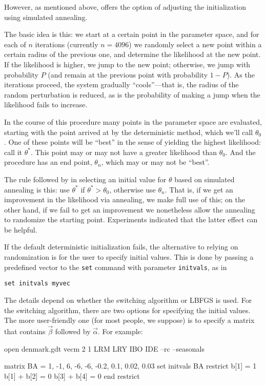 However, as mentioned above,  offers the option of adjusting the
initialization using simulated annealing.  

The basic idea is this: we start at a certain point in the parameter
space, and for each of $n$ iterations (currently $n=4096$) we randomly
select a new point within a certain radius of the
previous one, and determine the likelihood at the new point.  If the
likelihood is higher, we jump to the new point; otherwise, we jump
with probability $P$ (and remain at the previous point with
probability $1-P$).  As the iterations proceed, the system gradually
``cools''---that is, the radius of the random perturbation is
reduced, as is the probability of making a jump when the likelihood
fails to increase.

In the course of this procedure many points in the parameter space are
evaluated, starting with the point arrived at by the deterministic
method, which we'll call $\theta_0$.  One of these points will be
``best'' in the sense of yielding the highest likelihood: call it
$\theta^*$.  This point may or may not have a greater likelihood than
$\theta_0$.  And the procedure has an end point, $\theta_n$, which may
or may not be ``best''.

The rule followed by  in selecting an initial value for $\theta$
based on simulated annealing is this: use $\theta^*$ if $\theta^* >
\theta_0$, otherwise use $\theta_n$.  That is, if we get an
improvement in the likelihood via annealing, we make full use of this;
on the other hand, if we fail to get an improvement we nonetheless
allow the annealing to randomize the starting point.  Experiments
indicated that the latter effect can be helpful.

If the default deterministic initialization fails, the alternative to
relying on randomization is for the user to specify initial values.
This is done by passing a predefined vector to the \texttt{set}
command with parameter \texttt{initvals}, as in
%
\begin{verbatim}
set initvals myvec
\end{verbatim}

The details depend on whether the switching algorithm or LBFGS is
used.  For the switching algorithm, there are two options for
specifying the initial values.  The more user-friendly one (for most
people, we suppose) is to specify a matrix that contains $\vec{\beta}$
followed by $\vec{\alpha}$. For example:
\begin{code}
open denmark.gdt
vecm 2 1 LRM LRY IBO IDE --rc --seasonals

matrix BA = {1, -1, 6, -6, -6, -0.2, 0.1, 0.02, 0.03}
set initvals BA
restrict
  b[1] = 1
  b[1] + b[2] = 0
  b[3] + b[4] = 0
end restrict
\end{code}

